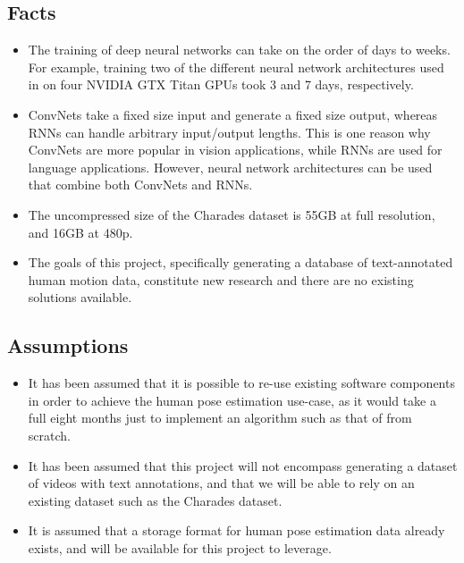 \documentclass{scrreprt}
\begin{document}
\subsection{Facts}

\begin{itemize}
        \item The training of deep neural networks can take on the order of
                days to weeks. For example, training two of the different
                neural network architectures used in
                \cite{DBLP:journals/corr/PfisterCZ15} on four NVIDIA GTX Titan
                GPUs took 3 and 7 days, respectively.
        \item ConvNets take a fixed size input and generate a fixed size
                output, whereas RNNs can handle arbitrary input/output lengths.
                This is one reason why ConvNets are more popular in vision
                applications, while RNNs are used for language applications.
                However, neural network architectures can be used that combine
                both ConvNets and RNNs.
        \item The uncompressed size of the Charades dataset is 55GB at full
                resolution, and 16GB at 480p.
        \item The goals of this project, specifically generating a database of
                text-annotated human motion data, constitute new research and
                there are no existing solutions available.
\end{itemize}

\subsection{Assumptions}

\begin{itemize}
        \item It has been assumed that it is possible to re-use existing
                software components in order to achieve the human pose
                estimation use-case, as it would take a full eight months just
                to implement an algorithm such as that of
                \cite{DBLP:journals/corr/PfisterCZ15} from scratch.
        \item It has been assumed that this project will not encompass
                generating a dataset of videos with text annotations, and that
                we will be able to rely on an existing dataset such as the
                Charades dataset.
        \item It is assumed that a storage format for human pose estimation
                data already exists, and will be available for this project to
                leverage.
\end{itemize}
\end{document}
